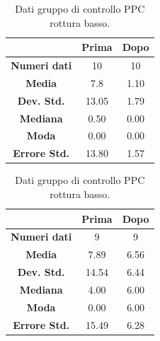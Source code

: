 \begin{table}
\centering
\setlength\tabcolsep{4pt}
\begin{minipage}{0.48\textwidth}
\centering

\begin{tabular}{|c|c|c|} \hline
{\textbf{}} & {\textbf{  \hspace{8pt}Prima\hspace{8pt} }} & {\textbf{ \hspace{8pt}Dopo\hspace{8pt}  }}\\ \hline
\textbf{Numeri dati} & 10 & 10 \\ 
\textbf{Media} & 7.8 & 1.10 \\  
\textbf{Dev. Std.} & 13.05 & 1.79 \\  
\textbf{Mediana} & 0.50 & 0.00 \\ 
\textbf{Moda} & 0.00 & 0.00 \\ 
\textbf{Errore Std.} & 13.80 & 1.57 \\ 
\hline
\end{tabular}
\caption{Dati gruppo sperimentale PPC rottura basso.}

\label{tab:accuracy} 
\end{minipage}%
\hfill
\begin{minipage}{0.48\textwidth}
\centering

\begin{tabular}{|c|c|c|} \hline
{\textbf{}} & {\textbf{  \hspace{8pt}Prima\hspace{8pt} }} & {\textbf{ \hspace{8pt}Dopo\hspace{8pt}  }}\\ \hline
\textbf{Numeri dati} & 9 & 9 \\ 
\textbf{Media} & 7.89 & 6.56 \\  
\textbf{Dev. Std.} & 14.54 & 6.44 \\  
\textbf{Mediana} & 4.00 & 6.00 \\  
\textbf{Moda} & 0.00 & 6.00 \\
\textbf{Errore Std.} & 15.49 & 6.28 \\
\hline
\end{tabular}
\caption{Dati gruppo di controllo PPC rottura basso.}

 \label{tab:ompdiff} 
\end{minipage}
\hfill
\begin{minipage}{0.48\textwidth}
\centering


\end{minipage}
\end{table}
